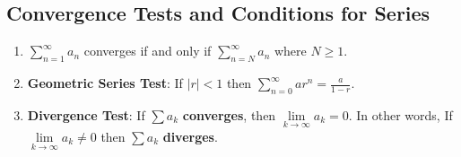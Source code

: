 \documentclass[12pt]{article}
\begin{document}
\subsection{Convergence Tests and Conditions for Series}
\begin{small}
\begin{enumerate}
\item $\displaystyle{\sum \limits_{n=1}^\infty a_n}$ converges if and only if $\displaystyle{\sum \limits_{n=N}^\infty a_n}$ where $N\geq 1$.
\item \textbf{Geometric Series Test}: If $|r|<1$ then $\displaystyle{\sum \limits_{n=0}^\infty a r^n = \frac{a}{1-r}}$.
\item \textbf{Divergence Test}: If $\sum a_k$ \textbf{converges}, then $\lim \limits_{k \to \infty} a_k=0$. In other words, If $\lim \limits_{k \to \infty} a_k\neq 0$ then $\sum a_k$ \textbf{diverges}.


\end{enumerate}
\end{small}
\end{document}

